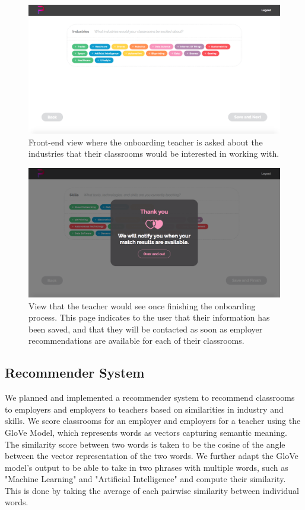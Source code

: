     \begin{figure}[H]
        \centering
        \includegraphics[scale=0.2]{industry.png}
        \caption{Front-end view where the onboarding teacher is asked about the industries that their classrooms would be interested in working with.}
        \label{fig:industrypref}
    \end{figure}
    
    \begin{figure}[H]
        \centering
        \includegraphics[scale=0.2]{end.png}
        \caption{View that the teacher would see once finishing the onboarding process. This page indicates to the user that their information has been saved, and that they will be contacted as soon as employer recommendations are available for each of their classrooms.}
        \label{fig:completed}
    \end{figure}

\subsection{Recommender System}

	We planned and implemented a recommender system to recommend classrooms to employers and employers to teachers based on similarities in industry and skills. We score classrooms for an employer and employers for a teacher using the GloVe Model, which represents words as vectors capturing semantic meaning. The similarity score between two words is taken to be the cosine of the angle between the vector representation of the two words. We further adapt the GloVe model's output to be able to take in two phrases with multiple words, such as "Machine Learning" and "Artificial Intelligence" and compute their similarity. This is done by taking the average of each pairwise similarity between individual words.
	
